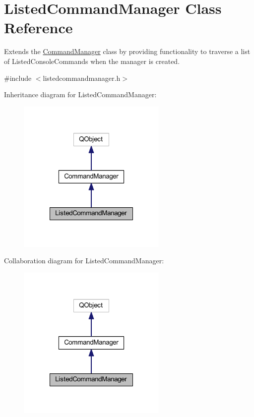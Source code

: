 \hypertarget{class_listed_command_manager}{\section{Listed\-Command\-Manager Class Reference}
\label{class_listed_command_manager}
}


Extends the \hyperlink{class_command_manager}{Command\-Manager} class by providing functionality to traverse a list of Listed\-Console\-Commands when the manager is created.  




{\ttfamily \#include $<$listedcommandmanager.\-h$>$}



Inheritance diagram for Listed\-Command\-Manager\-:\nopagebreak
\begin{figure}[H]
\begin{center}
\leavevmode
\includegraphics[width=204pt]{class_listed_command_manager__inherit__graph}
\end{center}
\end{figure}


Collaboration diagram for Listed\-Command\-Manager\-:\nopagebreak
\begin{figure}[H]
\begin{center}
\leavevmode
\includegraphics[width=204pt]{class_listed_command_manager__coll__graph}
\end{center}
\end{figure}
